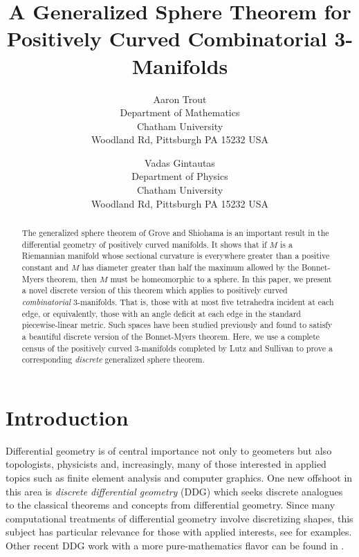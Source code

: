 \documentclass[12pt]{article}
\begin{document}
\nocite{*}

\title{A Generalized Sphere Theorem for Positively Curved Combinatorial 3-Manifolds}

\author{Aaron Trout \\ Department of Mathematics \\
Chatham University \\ Woodland Rd, Pittsburgh PA 15232 USA \and
Vadas Gintautas\\ Department of Physics \\
Chatham University \\ Woodland Rd, Pittsburgh PA 15232 USA}


\maketitle

\begin{abstract}
The generalized sphere theorem of Grove and Shiohama is an important result in the differential geometry of positively curved manifolds. It shows that if $M$ is a Riemannian manifold whose sectional curvature is everywhere greater than a positive constant and $M$ has diameter greater than half the maximum allowed by the Bonnet-Myers theorem, then $M$ must be homeomorphic to a sphere. In this paper, we present a novel discrete version of this theorem which applies to positively curved {\em combinatorial} 3-manifolds. That is, those with at most five tetrahedra incident at each edge, or equivalently, those with an angle deficit at each edge in the standard piecewise-linear metric. Such spaces have been studied previously and found to satisfy a beautiful discrete version of the Bonnet-Myers theorem. Here, we use a complete census of the positively curved 3-manifolds completed by Lutz and Sullivan to prove a corresponding {\em discrete} generalized sphere theorem.
\end{abstract}


\section{Introduction}

Differential geometry is of central importance not only to geometers but also topologists, physicists and, increasingly, many of those interested in applied topics such as finite element analysis and computer graphics. One new offshoot in this area is {\em discrete differential geometry} (DDG) which seeks discrete analogues to the classical theorems and concepts from differential geometry. Since many computational treatments of differential geometry involve discretizing shapes, this subject has particular relevance for those with applied interests, see \cite{grinspun2006discrete} for examples. Other recent DDG work with a more pure-mathematics flavor can be found in \cite{BMM,Crowley,EMM,forman2,GGL1,GGL2,GGL3,stone}. 
\end{document}
